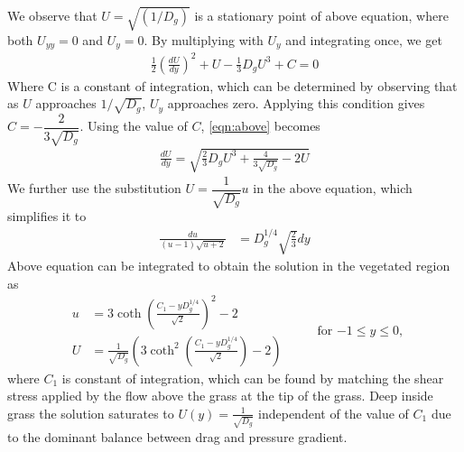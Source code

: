 \documentclass[letterpaper,10pt]{article}
\begin{document}
\noindent
We observe that $U = \sqrt{(1/D_g)}$ is a stationary point of above equation, where both $U_{yy}=0$ and $U_y =0 $. By multiplying with $U_y$ and integrating once, we get
\begin{equation}
\begin{split}
 \frac{1}{2} \left( \frac{dU}{dy} \right)^2 +U - \frac{1}{3} D_g U^3 + C = 0
\end{split}
\label{eqn:above}
\end{equation}
Where C is a constant of integration, which can be determined by observing that as $U$ approaches $1/\sqrt{D_g}$, $U_y$ approaches zero. Applying this condition gives $C = -\dfrac{2}{3\sqrt{D_g}}$. Using the value of $C$, \eqref{eqn:above} becomes 
\begin{equation}
\begin{split}
 \frac{dU}{dy} = \sqrt{\frac{2}{3}D_g U^3+\frac{4}{3\sqrt{D_g}}-2U }
\end{split}
\end{equation}
We further use the substitution $U=\dfrac{1}{\sqrt{D_g}} u $ in the above equation, which simplifies it to
\begin{equation}
\begin{split}
 \frac{du}{(u-1)\sqrt{u+2} } &= {D_g^{1/4}}\sqrt{\frac{2}{3}} dy
\end{split}
\end{equation}
Above equation can be integrated to obtain the solution in the vegetated region as
\begin{equation}
\begin{split}
u &= 3 \coth \left(\frac{C_1-y D_g^{1/4}}{\sqrt{2}}  \right)^2-2 \\
U &= \frac{1}{\sqrt{D_g}} \left( 3 \coth^2 \left(\frac{C_1-y D_g^{1/4}}{\sqrt{2}}  \right)-2    \right)
\label{under_grass_sol}
\end{split}
 \hspace{1cm} \text{for $-1\le y\le 0$,}
\end{equation}
where $C_1$ is constant of integration, which can be found by matching the shear stress applied by the flow above the grass at the tip of the grass. {\color{red} Deep inside grass the 
solution saturates to $U(y)=\frac{1}{\sqrt{D_g}}$ independent of the value of $C_1$ due to the dominant balance between drag and pressure gradient.}
\end{document}

